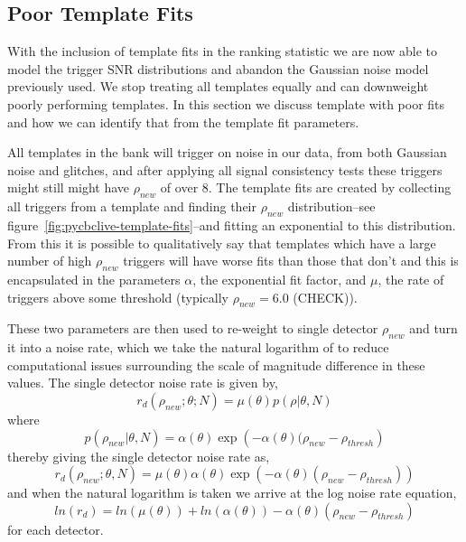 \subsection{\label{sec:pycbclive-poor-temp-fits}Poor Template Fits}


With the inclusion of template fits in the ranking statistic we are now able to model the trigger SNR distributions and abandon the Gaussian noise model previously used. We stop treating all templates equally and can downweight poorly performing templates. In this section we discuss template with poor fits and how we can identify that from the template fit parameters.

All templates in the bank will trigger on noise in our data, from both Gaussian noise and glitches, and after applying all signal consistency tests these triggers might still might have $\rho_{new}$ of over $8$. The template fits are created by collecting all triggers from a template and finding their $\rho_{new}$ distribution--see figure~\ref{fig:pycbclive-template-fits}--and fitting an exponential to this distribution. From this it is possible to qualitatively say that templates which have a large number of high $\rho_{new}$ triggers will have worse fits than those that don't and this is encapsulated in the parameters $\alpha$, the exponential fit factor, and $\mu$, the rate of triggers above some threshold (typically $\rho_{new} = 6.0$ (CHECK)).

These two parameters are then used to re-weight to single detector $\rho_{new}$ and turn it into a noise rate, which we take the natural logarithm of to reduce computational issues surrounding the scale of magnitude difference in these values. The single detector noise rate is given by,
%
\begin{equation}
    r_{d}(\rho_{new}; {\theta}; N) = \mu(\theta) p(\rho | \theta, N) 
\label{eqn:pycbclive-single-noise-rate}
\end{equation}
%
where
%
\begin{equation}
    p(\rho_{new} | \theta, N) = \alpha(\theta) \exp\left(-\alpha(\theta)(\rho_{new} - \rho_{thresh}\right)
\label{eqn:pycbclive-p-definition}
\end{equation}
%
thereby giving the single detector noise rate as,
%
\begin{equation}
    r_{d}(\rho_{new}; {\theta}, N) = \mu(\theta) \alpha(\theta) \exp\left(-\alpha(\theta)(\rho_{new} - \rho_{thresh})\right)
\label{eqn:pycbclive-single-noise-rate-full}
\end{equation}
%
and when the natural logarithm is taken we arrive at the log noise rate equation,
%
\begin{equation}
    ln(r_{d}) = ln(\mu(\theta)) +  ln(\alpha(\theta)) - \alpha(\theta)(\rho_{new} - \rho_{thresh})
\label{eqn:pycbclive-single-log-noise-rate}
\end{equation}
%
for each detector.

